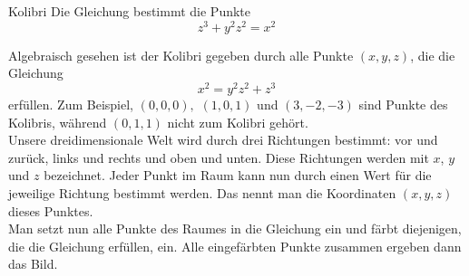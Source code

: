 \begin{surferPage}{Kolibri}
Die Gleichung bestimmt die Punkte\\
  
  \smallskip
\[z^3+ y^2	z^2	= x^2\]

\singlespacing
Algebraisch gesehen ist der Kolibri gegeben durch alle Punkte  $(x, y, z)$, die die Gleichung
\smallskip
\[ x^2= y^2z^2+z^3\]
\smallskip
 erfüllen. Zum Beispiel, $(0,0,0),$ $(1,0,1)$ und $(3,-2,-3)$ sind Punkte des Kolibris, während $(0,1,1)$ nicht zum Kolibri gehört.\\
 \singlespacing
Unsere dreidimensionale Welt wird durch drei Richtungen bestimmt: vor und zurück, links und rechts und oben und unten. Diese Richtungen werden mit $x$, $y$ und $z$ bezeichnet. Jeder Punkt im Raum kann nun durch einen Wert für die jeweilige Richtung bestimmt werden. Das nennt man die Koordinaten $(x,y,z)$ dieses Punktes.\\
\singlespacing
Man setzt nun alle Punkte des Raumes in die Gleichung ein und färbt diejenigen, die die Gleichung erfüllen, ein. Alle eingefärbten Punkte zusammen ergeben dann das Bild.
\end{surferPage}